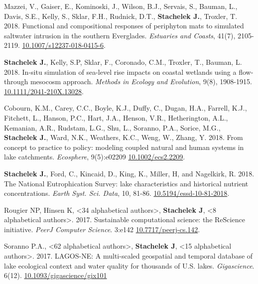 \documentclass[11pt]{article}
\makeatletter
\newlength{\bibhang}
\newlength{\bibsep}
 {\@listi \global\bibsep\itemsep \global\advance\bibsep by\parsep}
\newenvironment{bibenum*}
  {\renewcommand\labelenumi{[\theenumi]}%
   \etaremune[
     topsep=0pt,
     itemsep=\bibsep,
     parsep=0pt,partopsep=0pt,
     itemindent=-\bibhang,
     leftmargin={\bibhang+\widthof{[999]}}]}
  {\endetaremune}
\makeatother
\begin{document}
\begin{bibenum*}
\item Mazzei, V., Gaiser, E., Kominoski, J., Wilson, B.J., Servais, S., Bauman, L., Davis, S.E., Kelly, S., Sklar, F.H., Rudnick, D.T., \textbf{Stachelek J.}, Troxler, T. 2018. Functional and compositional responses of periphyton mats to simulated saltwater intrusion in the southern Everglades. \emph{Estuaries and Coasts}, 41(7), 2105-2119. \href{https://doi.org/10.1007/s12237-018-0415-6}{10.1007/s12237-018-0415-6}.

\item \textbf{Stachelek J.}, Kelly, S.P, Sklar, F., Coronado, C.M., Troxler, T., Bauman, L. 2018. In-situ simulation of sea-level rise impacts on coastal wetlands using a flow-through mesocosm approach. \emph{Methods in Ecology and Evolution}, 9(8), 1908-1915. \href{https://doi.org/10.1111/2041-210X.13028}{10.1111/2041-210X.13028}.

\item Cobourn, K.M., Carey, C.C., Boyle, K.J., Duffy, C., Dugan, H.A., Farrell, K.J., Fitchett, L., Hanson, P.C., Hart, J.A., Henson, V.R., Hetherington, A.L., Kemanian, A.R., Rudstam, L.G., Shu, L., Soranno, P.A., Sorice, M.G., \textbf{Stachelek J.}, Ward, N.K., Weathers, K.C., Weng, W., Zhang, Y. 2018. From concept to practice to policy: modeling coupled natural and human systems in lake catchments. \emph{Ecosphere}, 9(5):e02209 \href{https://doi.org/10.1002/ecs2.2209}{10.1002/ecs2.2209}.

\item \textbf{Stachelek J.}, Ford, C., Kincaid, D., King, K., Miller, H, and Nagelkirk, R. 2018. The National Eutrophication Survey: lake characteristics and historical nutrient concentrations. \emph{Earth Syst. Sci. Data}, 10, 81-86. \href{https://doi.org/10.5194/essd-10-81-2018}{10.5194/essd-10-81-2018}.

\item Rougier NP, Hinsen K, <34 alphabetical authors>, \textbf{Stachelek J}, <8 alphabetical authors>. 2017. Sustainable computational science: the ReScience initiative. \emph{PeerJ Computer Science}. 3:e142 \href{https://doi.org/10.7717/peerj-cs.142}{10.7717/peerj-cs.142}.

\item Soranno P.A., <62 alphabetical authors>, \textbf{Stachelek J}, <15 alphabetical authors>. 2017. LAGOS-NE: A multi-scaled geospatial and temporal database of lake ecological context and water quality for thousands of U.S. lakes. \emph{Gigascience}. 6(12). \href{https://doi.org/10.1093/gigascience/gix101}{10.1093/gigascience/gix101}


\end{bibenum*}
\end{document}
